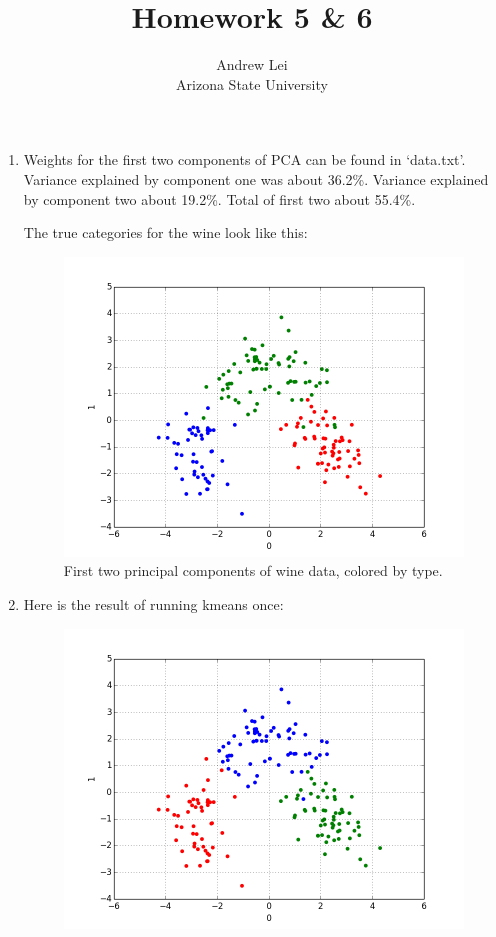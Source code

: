 \documentclass{article}
\begin{document}
	\setlength{\droptitle}{-10em}
	\title{Homework 5 \& 6}
	\author{Andrew Lei\\Arizona State University}
	\maketitle
	
	\begin{enumerate}
		\item Weights for the first two components of PCA can be found in `data.txt'. Variance explained by component one was about 36.2\%. Variance explained by component two about 19.2\%. Total of first two about 55.4\%.
		\par 
		The true categories for the wine look like this:
		\begin{figure}[H]
		\centering
		\includegraphics[scale=0.5]{hw5true.png}
		\caption{First two principal components of wine data, colored by type.}
		\end{figure}
		\item Here is the result of running kmeans once:
		\begin{figure}[H]
		\centering
		\includegraphics[scale=0.5]{hw5pt2a.png}

\end{figure}
\end{enumerate}
\end{document}
